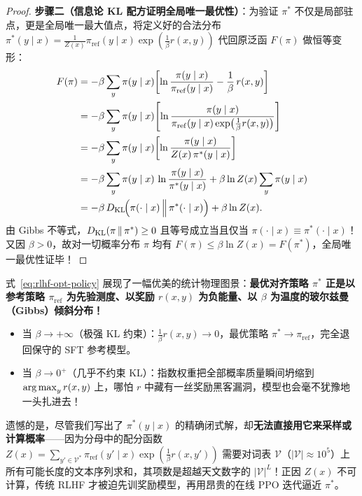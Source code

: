 \begin{thmBox}
\begin{proof}
\textbf{步骤二（信息论 KL 配方证明全局唯一最优性）}：为验证 $\pi^*$ 不仅是局部驻点，更是全局唯一最大值点，将定义好的合法分布 $\pi^*(y \mid x) = \frac{1}{Z(x)}\pi_{\mathrm{ref}}(y\mid x)\exp(\frac{1}{\beta}r(x,y))$ 代回原泛函 $F(\pi)$ 做恒等变形：
\begin{align*}
  F(\pi)
  &= -\beta \sum_y \pi(y \mid x)\!\left[\ln\frac{\pi(y \mid x)}{\pi_{\mathrm{ref}}(y \mid x)} - \frac{1}{\beta}\,r(x, y)\right] \\
  &= -\beta \sum_y \pi(y \mid x)\!\left[\ln\frac{\pi(y \mid x)}{\pi_{\mathrm{ref}}(y \mid x)\exp\!\big(\frac{1}{\beta}r(x,y)\big)}\right] \\
  &= -\beta \sum_y \pi(y \mid x)\!\left[\ln\frac{\pi(y \mid x)}{Z(x)\,\pi^*(y \mid x)}\right] \\
  &= -\beta \sum_y \pi(y \mid x)\,\ln\frac{\pi(y \mid x)}{\pi^*(y \mid x)} + \beta \ln Z(x)\sum_y \pi(y \mid x) \\
  &= -\beta\,D_{\mathrm{KL}}\!\Big(\pi(\cdot \mid x) \,\Big\|\, \pi^*(\cdot \mid x)\Big) + \beta \ln Z(x).
\end{align*}
由 Gibbs 不等式，$D_{\mathrm{KL}}(\pi \,\|\, \pi^*) \ge 0$ 且等号成立当且仅当 $\pi(\cdot \mid x) \equiv \pi^*(\cdot \mid x)$！又因 $\beta > 0$，故对一切概率分布 $\pi$ 均有 $F(\pi) \le \beta \ln Z(x) = F(\pi^*)$，全局唯一最优性证毕！
\end{proof}
\end{thmBox}

式~\eqref{eq:rlhf-opt-policy} 展现了一幅优美的统计物理图景：\textbf{最优对齐策略 $\pi^*$ 正是以参考策略 $\pi_{\mathrm{ref}}$ 为先验测度、以奖励 $r(x,y)$ 为负能量、以 $\beta$ 为温度的玻尔兹曼（Gibbs）倾斜分布！}
\begin{itemize}
  \item 当 $\beta \to +\infty$（极强 KL 约束）：$\frac{1}{\beta}r(x,y) \to 0$，最优策略 $\pi^* \to \pi_{\mathrm{ref}}$，完全退回保守的 SFT 参考模型。
  \item 当 $\beta \to 0^+$（几乎不约束 KL）：指数权重把全部概率质量瞬间坍缩到 $\operatorname*{arg\,max}_y r(x, y)$ 上，哪怕 $r$ 中藏有一丝奖励黑客漏洞，模型也会毫不犹豫地一头扎进去！
\end{itemize}

遗憾的是，尽管我们写出了 $\pi^*(y\mid x)$ 的精确闭式解，却\textbf{无法直接用它来采样或计算概率}——因为分母中的配分函数 $Z(x) = \sum_{y' \in \mathcal{V}^*} \pi_{\mathrm{ref}}(y'\mid x)\exp(\frac{1}{\beta}r(x, y'))$ 需要对词表 $\mathcal{V}$（$|\mathcal{V}| \approx 10^5$）上所有可能长度的文本序列求和，其项数是超越天文数字的 $|\mathcal{V}|^L$！正因 $Z(x)$ 不可计算，传统 RLHF 才被迫先训奖励模型，再用昂贵的在线 PPO 迭代逼近 $\pi^*$。

